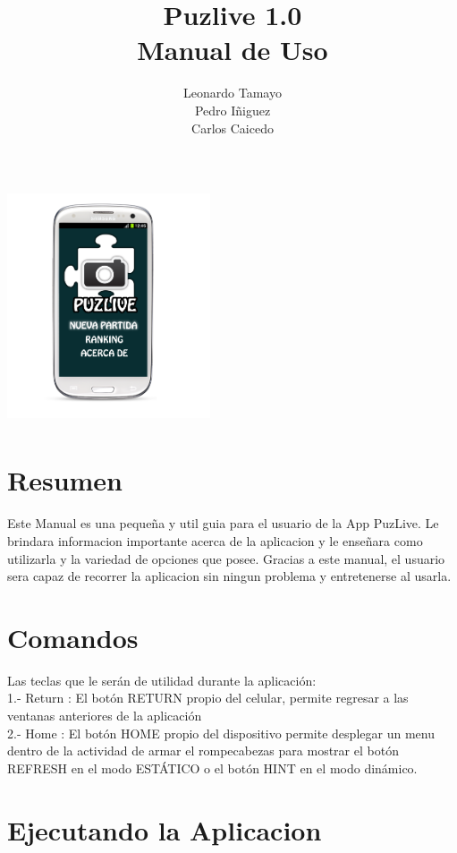 \documentclass[10pt]{article}
\title{\bfseries\Huge Puzlive 1.0\\ Manual de Uso}
\author{Leonardo Tamayo \\Pedro Iñiguez \\Carlos Caicedo}
\date{}
\begin{document}
\begin{minipage}{0.65\textwidth}
\begingroup
\let\center\flushleft
\let\endcenter\endflushleft
\maketitle

\endgroup
\end{minipage}
\begin{minipage}{0.3\textwidth}

\includegraphics[height=7cm,width=6cm]{androidpro4.png}
\end{minipage}

\section{Resumen}
	Este Manual es una pequeña y util guia para el usuario de la App PuzLive. Le brindara informacion importante acerca de la aplicacion y le enseñara como 
utilizarla y la variedad de opciones que posee. Gracias a este manual, el usuario sera capaz de recorrer la aplicacion sin ningun problema y entretenerse al usarla.

\section{Comandos}
	Las teclas que le ser\'an de utilidad durante la aplicaci\'on:
	\\1.- Return : El bot\'on RETURN propio del celular, permite regresar a las ventanas anteriores de la aplicaci\'on
	\\2.- Home : El bot\'on HOME propio del dispositivo permite desplegar un menu dentro de la actividad de armar el rompecabezas para mostrar el bot\'on REFRESH
	en el modo EST\'ATICO o el bot\'on HINT en el modo din\'amico.
	

\section{Ejecutando la Aplicacion}
\end{document}
